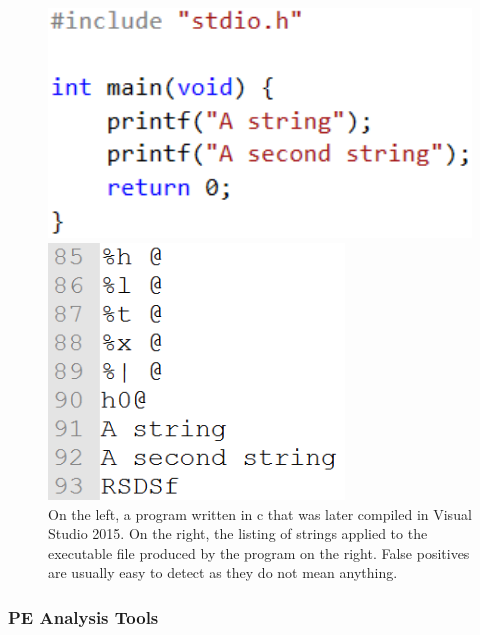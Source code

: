 \begin{figure}[!htb]
	\begin{minipage}[b]{0.4\textwidth}
		\centering
		\includegraphics[width=1\textwidth]{reverse_engineering/strings_c_code.png}
	\end{minipage}
	\hfill
	\begin{minipage}[b]{0.4\textwidth}
		\centering
		\includegraphics[width=0.7\textwidth]{reverse_engineering/strings_output.png}
	\end{minipage}
	\caption{On the left, a program written in c that was later compiled in Visual Studio 2015. On the right, the listing of strings applied to the executable file produced by the program on the right. False positives are usually easy to detect as they do not mean anything.}
	\label{fig:strings_in_action}
\end{figure}


\subsubsection{PE Analysis Tools}
